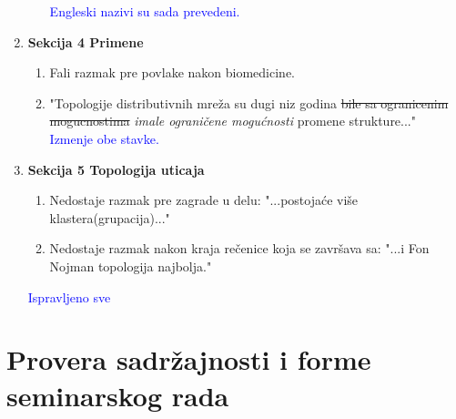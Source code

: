 \documentclass[a4paper]{report}
\newcommand{\odgovor}[1]{\textcolor{blue}{#1}}
\begin{document}
\begin{enumerate}
\begin{enumerate}
        \odgovor{Engleski nazivi su sada prevedeni.}
        
    \end{enumerate}
    
    \item \textbf{Sekcija 4 Primene}
    \begin{enumerate}
        \item Fali razmak pre povlake nakon biomedicine.
        \item "Topologije distributivnih mreža su dugi niz godina \st{bile sa ogranicenim mogucnostima} \textit{imale ograničene mogućnosti} promene strukture..."\\
        \odgovor{Izmenje obe stavke.}
    \end{enumerate}
    
    \item \textbf{Sekcija 5 Topologija uticaja}
    \begin{enumerate}
        \item Nedostaje razmak pre zagrade u delu: "...postojaće više klastera(grupacija)..."
        \item Nedostaje razmak nakon kraja rečenice koja se završava sa: "...i Fon Nojman topologija najbolja."
    \end{enumerate}
    \odgovor{Ispravljeno sve}
\end{enumerate}

\section{Provera sadržajnosti i forme seminarskog rada}
\end{document}
